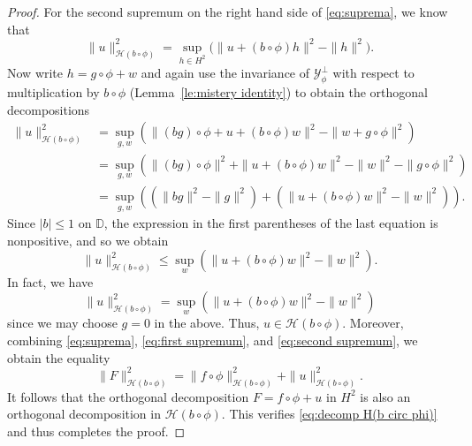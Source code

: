 \documentclass[10pt,a4paper]{amsart}
\def\D{\mathbb{D}}
\def\HH{{\mathcal H}}
\def\YY{{\mathcal Y}}
\renewcommand{\leq}{\leqslant}
\begin{document}
\begin{proof}
	
 For the second supremum on the right hand side of \eqref{eq:suprema}, we know that 
	\[
	\| u\|_{\HH(b\circ\phi)}^2=\sup_{h \in H^2}\big( \| u+(b\circ\phi)h\|^2-\|h\|^2\big).
	\]
Now write $h=g\circ \phi+w$ and again use the invariance of $\YY_\phi^\perp$ with respect to multiplication by $b\circ\phi$ (Lemma~\ref{le:mistery identity})  to obtain the orthogonal decompositions
	\[
	\begin{split}
			\| u\|_{\HH(b\circ\phi)}^2&=\sup_{g,w} \left(\| (bg)\circ\phi+u+(b\circ \phi)w\|^2-\|w+g\circ\phi\|^2\right)\\
&		=\sup_{g,w} \left(\|(bg)\circ\phi\|^2+\| u+(b\circ\phi)w\|^2-\|w\|^2-\|g\circ\phi\|^2\right)\\
&=\sup_{g,w}\left((\|bg\|^2-\|g\|^2)+\left(\| u+(b\circ\phi)w\|^2-\|w\|^2\right)\right). 
	\end{split}
		\]
	Since $|b| \leq 1$ on $\D$, the expression in the first parentheses of the last equation is nonpositive, and so we obtain
		\[
			\| u\|_{\HH(b\circ\phi)}^2\leq \sup_w \left(\| u+(b\circ\phi)w\|^2-\|w\|^2\right) .
		\]
		In fact, we have 
	\begin{equation}\label{eq:second supremum}
			\| u\|_{\HH(b\circ\phi)}^2=\sup_w \left(\| u+(b\circ\phi)w\|^2-\|w\|^2\right)
	\end{equation}
	since we may choose $g=0$ in the above. Thus,  $ u\in \HH(b\circ\phi) $. Moreover, combining \eqref{eq:suprema}, \eqref{eq:first supremum}, and \eqref{eq:second supremum}, we obtain the equality
	\[
		\|F\|^2_{\mathcal{H}(b \circ \phi)}=\| f\circ\phi\|^2_{\HH(b\circ\phi)}+	\| u\|_{\HH(b\circ\phi)}^2.
	\]
	It follows that the orthogonal decomposition $F=f\circ\phi+u$  in $H^2$  is also an orthogonal decomposition in $\HH(b\circ\phi)$. This verifies \eqref{eq:decomp H(b circ phi)} and thus completes the proof. 
	\end{proof}
\end{document}
